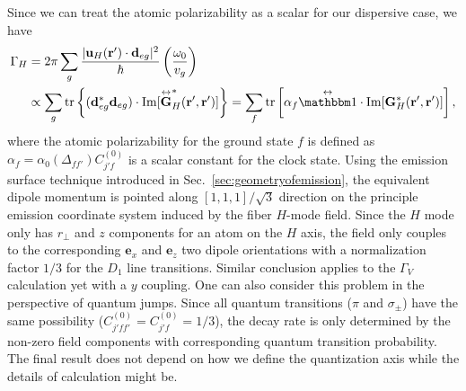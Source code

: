 Since we can treat the atomic polarizability as a scalar for our dispersive case, we have 
\begin{align}
\Gamma_H &= 2\pi \sum_g \frac{|\mathbf{u}_H(\br')\cdot \mathbf{d}_{eg}|^2}{\hbar}\left(\frac{\omega_0}{v_g} \right) \\
&\propto \sum_g \tr \left\{(\mathbf{d}_{eg}^*\mathbf{d}_{eg})\cdot \mathrm{Im} [\GFT_H^*(\br',\br')] \right\}  = \sum_f \tr \left[ \alpha_f \eye\cdot \mathrm{Im} [\mathbf{G}_H^*(\br',\br')]  \right],
\end{align}
where the atomic polarizability for the ground state $ f $ is defined as $ \alpha_f=\alpha_0(\Delta_{ff'})C_{j'f}^{(0)} $ is a scalar constant for the clock state. Using the emission surface technique introduced in Sec.~\ref{sec:geometryofemission}, the equivalent dipole momentum is pointed along $ [1,1,1]/\sqrt{3} $ direction on the principle emission coordinate system induced by the fiber $ H $-mode field. Since the $ H $ mode only has $ r\!_\perp $ and $ z $ components for an atom on the $ H $ axis, the field only couples to the corresponding $ \mathbf{e}_x $ and $ \mathbf{e}_z $ two dipole orientations with a normalization factor $ 1/3 $ for the $ D_1 $ line transitions. Similar conclusion applies to the $ \Gamma_V $ calculation yet with a $ y $ coupling. One can also consider this problem in the perspective of quantum jumps. Since all quantum transitions ($ \pi$ and $\sigma_\pm $) have the same possibility ($C_{j'ff'}^{(0)}=C_{j'f}^{(0)}=1/3 $), the decay rate is only determined by the non-zero field components with corresponding quantum transition probability. The final result does not depend on how we define the quantization axis while the details of calculation might be. 



